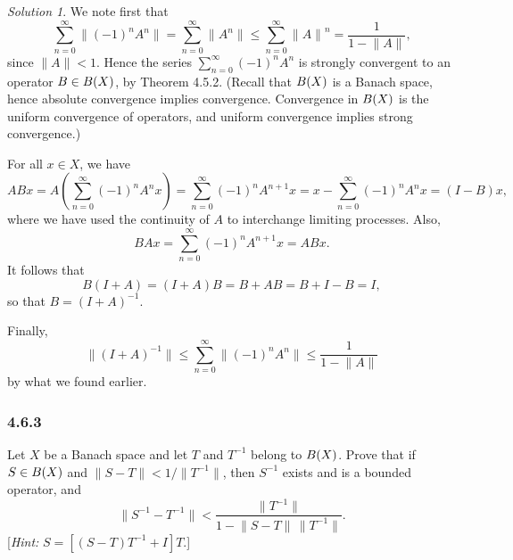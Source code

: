 \documentclass{report}
\newcommand{\norm}[1]{{\lVert #1 \rVert}}
\let\sc\relax
\newcommand{\sc}[1]{\mathscr{#1}}
\theoremstyle{remark}
\newtheorem*{solution}{Solution}
\begin{document}
\begin{solution}
  We note first that
  \begin{equation*}
    \sum_{n=0}^\infty \norm{(-1)^n A^n} = \sum_{n=0}^\infty \norm{A^n} \le \sum_{n=0}^\infty \norm{A}^n = \frac{1}{1 - \norm A},
  \end{equation*}
  since $\norm A < 1$. Hence the series $\sum_{n=0}^\infty (-1)^n A^n$ is strongly convergent to an operator $B \in \sc B(X)$, by Theorem 4.5.2. (Recall that $\sc B(X)$ is a Banach space, hence absolute convergence implies convergence. Convergence in $\sc B(X)$ is the uniform convergence of operators, and uniform convergence implies strong convergence.)

  For all $x \in X$, we have
  \begin{equation*}
    ABx = A \left( \sum_{n=0}^\infty (-1)^n A^n x \right) = \sum_{n=0}^\infty (-1)^n A^{n+1} x = x - \sum_{n=0}^\infty (-1)^n A^n x = (I - B)x,
  \end{equation*}
  where we have used the continuity of $A$ to interchange limiting processes. Also,
  \begin{equation*}
    BAx = \sum_{n=0}^\infty (-1)^n A^{n+1} x = ABx.
  \end{equation*}
  It follows that
  \begin{equation*}
    B(I+A) = (I+A)B = B + AB = B + I - B = I,
  \end{equation*}
  so that $B = (I + A)^{-1}$.

  Finally,
  \begin{equation*}
    \norm{(I + A)^{-1}} \le \sum_{n=0}^\infty \norm{(-1)^n A^n} \le \frac{1}{1 - \norm A}
  \end{equation*}
  by what we found earlier.
\end{solution}

\subsubsection*{4.6.3}
Let $X$ be a Banach space and let $T$ and $T^{-1}$ belong to $\sc B(X)$. Prove that if $S \in \sc B(X)$ and $\norm{S - T} < 1/\norm{T^{-1}}$, then $S^{-1}$ exists and is a bounded operator, and
\begin{equation*}
  \norm{S^{-1} - T^{-1}} < \frac{\norm{T^{-1}}}{1 - \norm{S - T} \, \norm{T^{-1}}}.
\end{equation*}
[\emph{Hint:} $S = [(S-T)T^{-1} + I]T$.]
\end{document}
